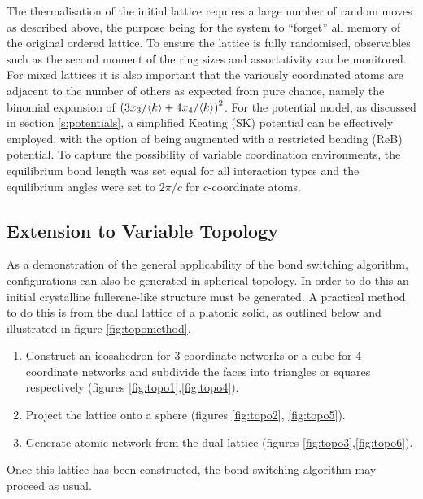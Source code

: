 The thermalisation of the initial lattice requires a large number of random moves as described above, the purpose being for the system to ``forget'' all memory of the original ordered lattice. 
To ensure the lattice is fully randomised, observables such as the second moment of the ring sizes and assortativity can be monitored. For mixed lattices it is also important that the variously coordinated atoms are adjacent to the number of others as expected from pure chance, namely the binomial expansion of $\left(3x_3/\langle k \rangle+4x_4/\langle k \rangle\right)^2$.
For the potential model, as discussed in section \ref{s:potentials}, a simplified Keating (SK) potential can be effectively employed, with the option of being augmented with a restricted bending (ReB) potential.
To capture the possibility of variable coordination environments, the equilibrium bond length was set equal for all interaction types and the equilibrium angles were set to $2\pi/c$ for $c$-coordinate atoms.

\subsection{Extension to Variable Topology}

As a demonstration of the general applicability of the bond switching algorithm, configurations can also be generated in spherical topology.
In order to do this an initial crystalline fullerene\--like structure must be generated. 
A practical method to do this is from the dual lattice of a platonic solid, as outlined below and illustrated in figure \ref{fig:topomethod}.
\begin{enumerate}
	\item Construct an icosahedron for 3\--coordinate networks or a cube for 4\--coordinate networks and subdivide the faces into triangles or squares respectively (figures \ref{fig:topo1},\ref{fig:topo4}).
	\item Project the lattice onto a sphere (figures \ref{fig:topo2}, \ref{fig:topo5}).
	\item Generate atomic network from the dual lattice (figures \ref{fig:topo3},\ref{fig:topo6}).
\end{enumerate}
Once this lattice has been constructed, the bond switching algorithm may proceed as usual.

